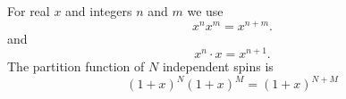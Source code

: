 \documentclass{article}
\begin{document}
For real $x$ and integers $n$ and $m$ we use
\begin{equation}
x^n x^m = x^{n+m} .
\label{eq:pow}
\end{equation}
and
\begin{equation}
x^{n} \cdot x = x^{n+1} .
\label{eq:pow2}
\end{equation}
The partition function of $N$ independent spins is
\begin{equation}
(1+x)^N (1+x)^M = (1+x)^{N+M}
\label{eq:pow3}
\end{equation}
\end{document}
